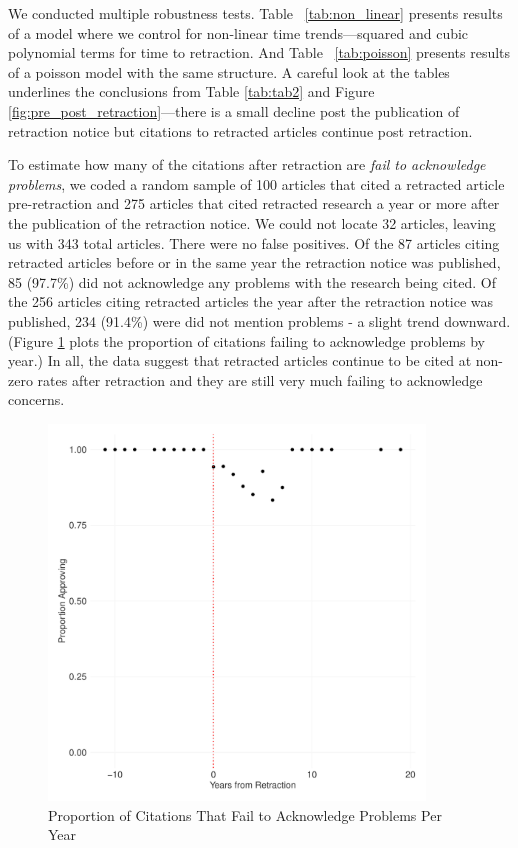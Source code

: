 \documentclass[12pt, letterpaper]{article}
\begin{document}
We conducted multiple robustness tests. Table ~\ref{tab:non_linear} presents results of a model where we control for non-linear time trends---squared and cubic polynomial terms for time to retraction. And Table ~\ref{tab:poisson} presents results of a poisson model with the same structure. A careful look at the tables underlines the conclusions from Table \ref{tab:tab2} and Figure \ref{fig:pre_post_retraction}---there is a small decline post the publication of retraction notice but citations to retracted articles continue post retraction. 

To estimate how many of the citations after retraction are \textit{fail to acknowledge problems}, we coded a random sample of 100 articles that cited a retracted article pre-retraction and 275 articles that cited retracted research a year or more after the publication of the retraction notice. We could not locate 32 articles, leaving us with 343 total articles. There were no false positives. Of the 87 articles citing retracted articles before or in the same year the retraction notice was published, 85 (97.7\%) did not acknowledge any problems with the research being cited. Of the 256 articles citing retracted articles the year after the retraction notice was published, 234 (91.4\%) were did not mention problems - a slight trend downward. (Figure \ref{fig:prop_approving_per_year} plots the proportion of citations failing to acknowledge problems by year.) In all, the data suggest that retracted articles continue to be cited at non-zero rates after retraction and they are still very much failing to acknowledge concerns.

\begin{figure}
\centering
\includegraphics[width=10cm]{../figs/pre_post_prop_approving.pdf}
\caption{Proportion of Citations That Fail to Acknowledge Problems Per Year}
\label{fig:prop_approving_per_year}
\end{figure}
\end{document}
